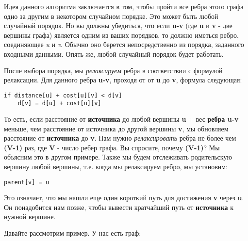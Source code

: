 \vspace{\baselineskip}

Идея данного алгоритма заключается в том, чтобы пройти все ребра этого графа одно за другим в некотором случайном порядке. Это может быть любой случайный порядок. Но вы должны убедиться, что если \textbf{u-v} (где \textbf{u} и \textbf{v} - две вершины графа) является одним из ваших порядков, то должно иметься ребро, соединяющее \textit{u} и \textit{v}. Обычно оно берется непосредственно из порядка, заданного входными данными. Опять же, любой случайный порядок будет работать.

\vspace{\baselineskip}

После выбора порядка, мы \textit{релаксируем} ребра в соответствии с формулой релаксации. Для данного ребра \textbf{u-v}, проходя от от \textbf{u} до \textbf{v}, формула следующая:

\begin{tcolorbox}
\begin{verbatim}
if distance[u] + cost[u][v] < d[v]
    d[v] = d[u] + cost[u][v]
\end{verbatim}
\end{tcolorbox}


То есть, если расстояние от \textbf{источника} до любой вершины \textbf{u} + вес \textbf{ребра u-v} меньше, чем расстояние от источника до другой вершины \textbf{v}, мы обновляем расстояние от \textbf{источника} до \textbf{v}. Нам нужно \textit{релаксировать} ребра не более чем \textbf{(V-1)} раз, где \textbf{V} - число ребер графа. Вы спросите, почему \textbf{(V-1)}? Мы объясним это в другом примере. Также мы будем отслеживать родительскую вершину любой вершины, т.е. когда мы релаксируем ребро, мы установим:

\begin{tcolorbox}
\begin{verbatim}
parent[v] = u
\end{verbatim}
\end{tcolorbox}

Это означает, что мы нашли еще один короткий путь для достижения \textbf{v} через \textbf{u}. Он понадобится нам позже, чтобы вывести кратчайший путь от \textbf{источника} к нужной вершине.

\vspace{\baselineskip}

Давайте рассмотрим пример. У нас есть граф:

\newpage

\begin{center}
\end{center}

